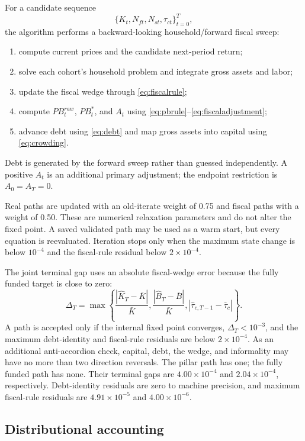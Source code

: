 \documentclass[12pt]{article}
\newcommand{\1}{\mathbf{1}}
\begin{document}
For a candidate sequence
\[
\{K_t,N_{ft},N_{st},\tau_{ct}\}_{t=0}^{T},
\]
the algorithm performs a backward-looking household/forward fiscal sweep:
\begin{enumerate}
\item compute current prices and the candidate next-period return;
\item solve each cohort's household problem and integrate gross assets and labor;
\item update the fiscal wedge through \eqref{eq:fiscalrule};
\item compute $PB_t^{raw}$, $PB_t^*$, and $A_t$ using
\eqref{eq:pbrule}--\eqref{eq:fiscaladjustment};
\item advance debt using \eqref{eq:debt} and map gross assets into capital using
\eqref{eq:crowding}.
\end{enumerate}
Debt is generated by the forward sweep rather than guessed independently. A positive $A_t$
is an additional primary adjustment; the endpoint restriction is $A_0=A_T=0$.

Real paths are updated with an old-iterate weight of 0.75 and fiscal paths with a weight of
0.50. These are numerical relaxation parameters and do not alter the fixed point. A saved
validated path may be used as a warm start, but every equation is reevaluated. Iteration stops
only when the maximum state change is below $10^{-4}$ and the fiscal-rule residual below
$2\times10^{-4}$.

The joint terminal gap uses an absolute fiscal-wedge error because the fully funded target is
close to zero:
\begin{equation}
\Delta_T=\max\left\{
\frac{|\widehat K_T-\bar K|}{\bar K},
\frac{|\widehat B_T-\bar B|}{\bar K},
|\widehat\tau_{c,T-1}-\bar\tau_c|
\right\}.
\label{eq:terminaltest}
\end{equation}
A path is accepted only if the internal fixed point converges, $\Delta_T<10^{-3}$, and the
maximum debt-identity and fiscal-rule residuals are below $2\times10^{-4}$. As an additional
anti-accordion check, capital, debt, the wedge, and informality may have no more than two
direction reversals. The pillar path has one; the fully funded path has none. Their terminal
gaps are $4.00\times10^{-4}$ and $2.04\times10^{-4}$, respectively. Debt-identity residuals
are zero to machine precision, and maximum fiscal-rule residuals are
$4.91\times10^{-5}$ and $4.00\times10^{-6}$.

\subsection{Distributional accounting}
\end{document}
